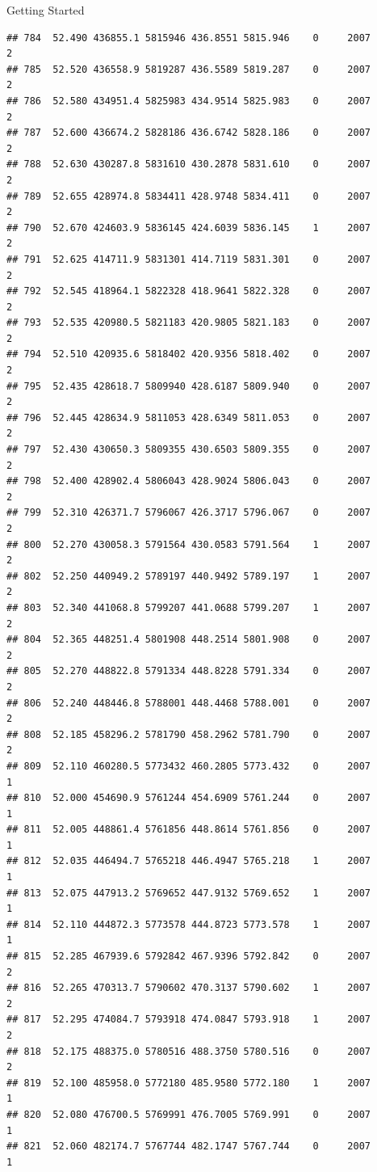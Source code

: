 \documentclass[
  ignorenonframetext,
]{beamer}
\begin{document}
\begin{frame}[fragile]{Getting Started}
\begin{verbatim}
## 784  52.490 436855.1 5815946 436.8551 5815.946    0     2007        2
## 785  52.520 436558.9 5819287 436.5589 5819.287    0     2007        2
## 786  52.580 434951.4 5825983 434.9514 5825.983    0     2007        2
## 787  52.600 436674.2 5828186 436.6742 5828.186    0     2007        2
## 788  52.630 430287.8 5831610 430.2878 5831.610    0     2007        2
## 789  52.655 428974.8 5834411 428.9748 5834.411    0     2007        2
## 790  52.670 424603.9 5836145 424.6039 5836.145    1     2007        2
## 791  52.625 414711.9 5831301 414.7119 5831.301    0     2007        2
## 792  52.545 418964.1 5822328 418.9641 5822.328    0     2007        2
## 793  52.535 420980.5 5821183 420.9805 5821.183    0     2007        2
## 794  52.510 420935.6 5818402 420.9356 5818.402    0     2007        2
## 795  52.435 428618.7 5809940 428.6187 5809.940    0     2007        2
## 796  52.445 428634.9 5811053 428.6349 5811.053    0     2007        2
## 797  52.430 430650.3 5809355 430.6503 5809.355    0     2007        2
## 798  52.400 428902.4 5806043 428.9024 5806.043    0     2007        2
## 799  52.310 426371.7 5796067 426.3717 5796.067    0     2007        2
## 800  52.270 430058.3 5791564 430.0583 5791.564    1     2007        2
## 802  52.250 440949.2 5789197 440.9492 5789.197    1     2007        2
## 803  52.340 441068.8 5799207 441.0688 5799.207    1     2007        2
## 804  52.365 448251.4 5801908 448.2514 5801.908    0     2007        2
## 805  52.270 448822.8 5791334 448.8228 5791.334    0     2007        2
## 806  52.240 448446.8 5788001 448.4468 5788.001    0     2007        2
## 808  52.185 458296.2 5781790 458.2962 5781.790    0     2007        2
## 809  52.110 460280.5 5773432 460.2805 5773.432    0     2007        1
## 810  52.000 454690.9 5761244 454.6909 5761.244    0     2007        1
## 811  52.005 448861.4 5761856 448.8614 5761.856    0     2007        1
## 812  52.035 446494.7 5765218 446.4947 5765.218    1     2007        1
## 813  52.075 447913.2 5769652 447.9132 5769.652    1     2007        1
## 814  52.110 444872.3 5773578 444.8723 5773.578    1     2007        1
## 815  52.285 467939.6 5792842 467.9396 5792.842    0     2007        2
## 816  52.265 470313.7 5790602 470.3137 5790.602    1     2007        2
## 817  52.295 474084.7 5793918 474.0847 5793.918    1     2007        2
## 818  52.175 488375.0 5780516 488.3750 5780.516    0     2007        2
## 819  52.100 485958.0 5772180 485.9580 5772.180    1     2007        1
## 820  52.080 476700.5 5769991 476.7005 5769.991    0     2007        1
## 821  52.060 482174.7 5767744 482.1747 5767.744    0     2007        1

\end{verbatim}
\end{frame}
\end{document}
